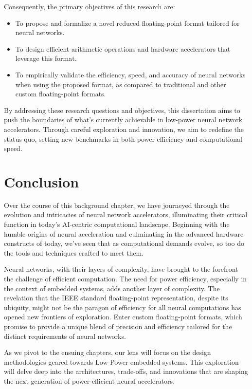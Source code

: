 Consequently, the primary objectives of this research are:

\begin{itemize}
	\item To propose and formalize a novel reduced floating-point format tailored for neural networks.
	\item To design efficient arithmetic operations and hardware accelerators that leverage this format.
	\item To empirically validate the efficiency, speed, and accuracy of neural networks when using the proposed format, as compared to traditional and other custom floating-point formats.
\end{itemize}

By addressing these research questions and objectives, this dissertation aims to push the boundaries of what's currently achievable in low-power neural network accelerators. Through careful exploration and innovation, we aim to redefine the status quo, setting new benchmarks in both power efficiency and computational speed.


\section{Conclusion}

Over the course of this background chapter, we have journeyed through the evolution and intricacies of neural network accelerators, illuminating their critical function in today's AI-centric computational landscape. Beginning with the humble origins of neural acceleration and culminating in the advanced hardware constructs of today, we've seen that as computational demands evolve, so too do the tools and techniques crafted to meet them.

Neural networks, with their layers of complexity, have brought to the forefront the challenge of efficient computation. The need for power efficiency, especially in the context of embedded systems, adds another layer of complexity. The revelation that the IEEE standard floating-point representation, despite its ubiquity, might not be the paragon of efficiency for all neural computations has opened new frontiers of exploration. Enter custom floating-point formats, which promise to provide a unique blend of precision and efficiency tailored for the distinct requirements of neural networks.

As we pivot to the ensuing chapters, our lens will focus on the design methodologies geared towards Low-Power embedded systems. This exploration will delve deep into the architectures, trade-offs, and innovations that are shaping the next generation of power-efficient neural accelerators. 

